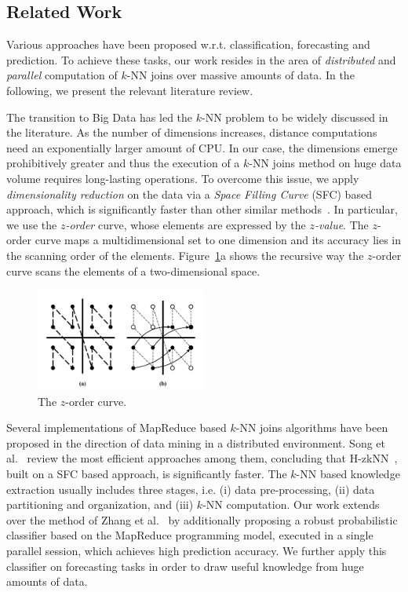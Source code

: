 \subsection{Related Work}
\label{sec:sec_relapp}
Various approaches have been proposed w.r.t. classification, forecasting and prediction. To achieve these tasks, our work resides in the area of \textit{distributed} and \textit{parallel} computation of $k$-NN joins over massive amounts of data. In the following, we present the relevant literature review.

The transition to Big Data has led the $k$-NN problem to be widely discussed in the literature. As the number of dimensions increases, distance computations need an exponentially larger amount of CPU. In our case, the dimensions emerge prohibitively greater and thus the execution of a $k$-NN joins method on huge data volume requires long-lasting operations. To overcome this issue, we apply \textit{dimensionality reduction} on the data via a \textit{Space Filling Curve} (SFC) based approach, which is significantly faster than other similar methods~\cite{liao2001SFC}. In particular, we use the \textit{$z$-order} curve, whose elements are expressed by the \textit{$z$-value}. The $z$-order curve maps a multidimensional set to one dimension and its accuracy lies in the scanning order of the elements. Figure~\ref{fig:z_order}a shows the recursive way the $z$-order curve scans the elements of a two-dimensional space.

\begin{figure}[!ht]
	\centering
	\includegraphics[width=0.5\textwidth]{figures/zorder.png}
	\caption{The $z$-order curve.}
	\label{fig:z_order}
\end{figure}

Several implementations of MapReduce based $k$-NN joins algorithms have been proposed in the direction of data mining in a distributed environment. Song et al.~\cite{song2015hal} review the most efficient approaches among them, concluding that H-zkNN~\cite{zhang2012epk}, built on a SFC based approach, is significantly faster. The $k$-NN based knowledge extraction usually includes three stages, i.e. (i) data pre-processing, (ii) data partitioning and organization, and (iii) $k$-NN computation. Our work extends over the method of Zhang et al.~\cite{zhang2012epk} by additionally proposing a robust probabilistic classifier based on the MapReduce programming model, executed in a single parallel session, which achieves high prediction accuracy. We further apply this classifier on forecasting tasks in order to draw useful knowledge from huge amounts of data.

